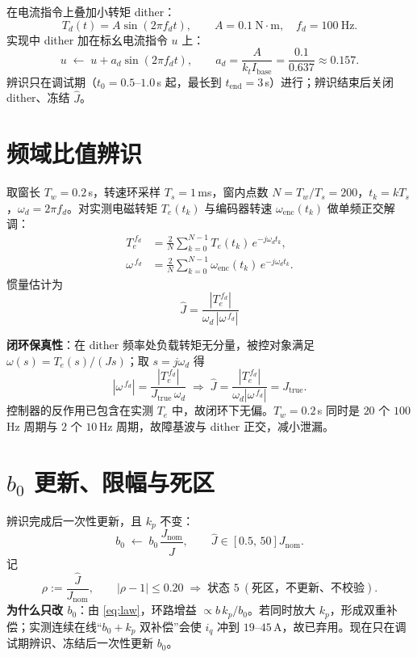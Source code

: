 \documentclass[11pt,a4paper]{article}
\newcommand{\Jnom}{J_{\mathrm{nom}}}
\newcommand{\Jtrue}{J_{\mathrm{true}}}
\newcommand{\Jhat}{\hat J}
\newcommand{\bzero}{b_0}
\newcommand{\Te}{T_e}
\newcommand{\wenc}{\omega_{\mathrm{enc}}}
\begin{document}
在电流指令上叠加小转矩 dither：
\begin{equation}
T_d(t)=A\sin(2\pi f_d t),\qquad A=0.1\ \mathrm{N\cdot m},\quad f_d=100\ \mathrm{Hz}.
\label{eq:dither}
\end{equation}
实现中 dither 加在标幺电流指令 $u$ 上：
\begin{equation}
u\;\leftarrow\;u+a_d\sin(2\pi f_d t),\qquad
a_d=\frac{A}{k_tI_{\mathrm{base}}}=\frac{0.1}{0.637}\approx0.157.
\label{eq:ad}
\end{equation}
辨识只在调试期（$t_0=0.5$--$1.0$\,s 起，最长到 $t_{\mathrm{end}}=3$\,s）进行；辨识结束后关闭 dither、冻结 $\Jhat$。

\section{频域比值辨识}

取窗长 $T_w=0.2$\,s，转速环采样 $T_s=1$\,ms，窗内点数 $N=T_w/T_s=200$，$t_k=kT_s$，$\omega_d=2\pi f_d$。对实测电磁转矩 $\Te(t_k)$ 与编码器转速 $\wenc(t_k)$ 做单频正交解调：
\begin{align}
\Te^{\,f_d}&=\frac{2}{N}\sum_{k=0}^{N-1}\Te(t_k)\,e^{-j\omega_d t_k},\label{eq:Tedft}\\
\omega^{\,f_d}&=\frac{2}{N}\sum_{k=0}^{N-1}\wenc(t_k)\,e^{-j\omega_d t_k}.\label{eq:wdf}
\end{align}
惯量估计为
\begin{equation}
\boxed{\;\Jhat=\frac{\left|\Te^{\,f_d}\right|}{\omega_d\,\left|\omega^{\,f_d}\right|}\;}
\label{eq:Jhat}
\end{equation}

\textbf{闭环保真性}：在 dither 频率处负载转矩无分量，被控对象满足 $\omega(s)=\Te(s)/(Js)$；取 $s=j\omega_d$ 得
\begin{equation}
\left|\omega^{\,f_d}\right|=\frac{\left|\Te^{\,f_d}\right|}{\Jtrue\,\omega_d}
\;\Longrightarrow\;
\Jhat=\frac{\left|\Te^{\,f_d}\right|}{\omega_d\left|\omega^{\,f_d}\right|}=\Jtrue.
\label{eq:closedloop}
\end{equation}
控制器的反作用已包含在实测 $\Te$ 中，故闭环下无偏。$T_w=0.2$\,s 同时是 $20$ 个 $100$\,Hz 周期与 $2$ 个 $10$\,Hz 周期，故障基波与 dither 正交，减小泄漏。

\section{$b_0$ 更新、限幅与死区}

辨识完成后一次性更新，且 $k_p$ 不变：
\begin{equation}
\bzero\;\leftarrow\;\bzero\,\frac{\Jnom}{\Jhat},\qquad
\Jhat\in\left[0.5,\,50\right]\Jnom.
\label{eq:b0update}
\end{equation}
记
\begin{equation}
\rho:=\frac{\Jhat}{\Jnom},\qquad
|\rho-1|\le0.20\;\Longrightarrow\;\text{状态 }5\ (\text{死区，不更新、不校验}).
\label{eq:deadband}
\end{equation}
\textbf{为什么只改 $b_0$}：由 \eqref{eq:law}，环路增益 $\propto b\,k_p/b_0$。若同时放大 $k_p$，形成双重补偿；实测连续在线“$b_0+k_p$ 双补偿”会使 $i_q$ 冲到 $19$--$45$\,A，故已弃用。现在只在调试期辨识、冻结后一次性更新 $b_0$。
\end{document}
